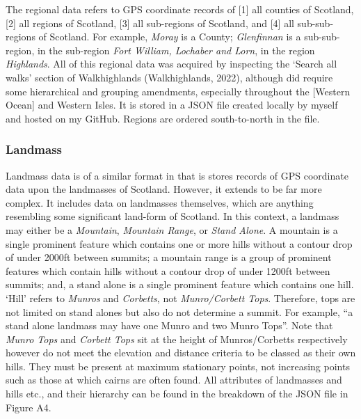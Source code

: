 \documentclass[11pt, english]{article}
\begin{document}
	The regional data refers to GPS coordinate records of [1] all counties of Scotland, [2] all regions of Scotland, [3] all sub-regions of Scotland, and [4] all sub-sub-regions of Scotland. For example, \textit{Moray} is a County; \textit{Glenfinnan} is a sub-sub-region, in the sub-region \textit{Fort William, Lochaber and Lorn}, in the region \textit{Highlands}. All of this regional data was acquired by inspecting the `Search all walks' section of Walkhighlands (Walkhighlands, 2022), although did require some hierarchical and grouping amendments, especially throughout the [Western Ocean] and Western Isles. It is stored in a JSON file created locally by myself and hosted on my GitHub. Regions are ordered south-to-north in the file.

		\subsubsection{Landmass}

	Landmass data is of a similar format in that is stores records of GPS coordinate data upon the landmasses of Scotland. However, it extends to be far more complex. It includes data on landmasses themselves, which are anything resembling some significant land-form of Scotland. In this context, a landmass may either be a \textit{Mountain}, \textit{Mountain Range}, or \textit{Stand Alone}. A mountain is a single prominent feature which contains one or more hills without a contour drop of under 2000ft between summits; a mountain range is a group of prominent features which contain hills without a contour drop of under 1200ft between summits; and, a stand alone is a single prominent feature which contains one hill. `Hill' refers to \textit{Munros} and \textit{Corbetts}, not \textit{Munro/Corbett Tops}. Therefore, tops are not limited on stand alones but also do not determine a summit. For example, ``a stand alone landmass may have one Munro and two Munro Tops''. Note that \textit{Munro Tops} and \textit{Corbett Tops} sit at the height of Munros/Corbetts respectively however do not meet the elevation and distance criteria to be classed as their own hills. They must be present at maximum stationary points, not increasing points such as those at which cairns are often found. All attributes of landmasses and hills etc., and their hierarchy can be found in the breakdown of the JSON file in Figure A4.\\
\end{document}
